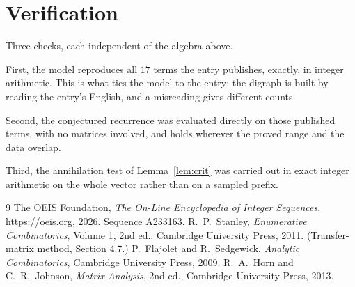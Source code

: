 \documentclass[11pt,a4paper]{article}
\theoremstyle{plain}
\theoremstyle{definition}
\begin{document}
\section{Verification}

Three checks, each independent of the algebra above.

First, the model reproduces all $17$ terms the entry publishes, exactly, in integer
arithmetic. This is what ties the model to the entry: the digraph is built by reading the
entry's English, and a misreading gives different counts.

Second, the conjectured recurrence was evaluated directly on those published terms, with no
matrices involved, and holds wherever the proved range and the data overlap.

Third, the annihilation test of Lemma~\ref{lem:crit} was carried out in exact integer
arithmetic on the whole vector rather than on a sampled prefix.

\begin{thebibliography}{9}
 The OEIS Foundation, \emph{The On-Line Encyclopedia of Integer
Sequences}, \url{https://oeis.org}, 2026. Sequence A233163.
 R.~P.~Stanley, \emph{Enumerative Combinatorics}, Volume 1, 2nd ed.,
Cambridge University Press, 2011. (Transfer-matrix method, Section 4.7.)
 P.~Flajolet and R.~Sedgewick, \emph{Analytic Combinatorics}, Cambridge
University Press, 2009.
 R.~A.~Horn and C.~R.~Johnson, \emph{Matrix Analysis}, 2nd ed., Cambridge
University Press, 2013.
\end{thebibliography}
\end{document}
